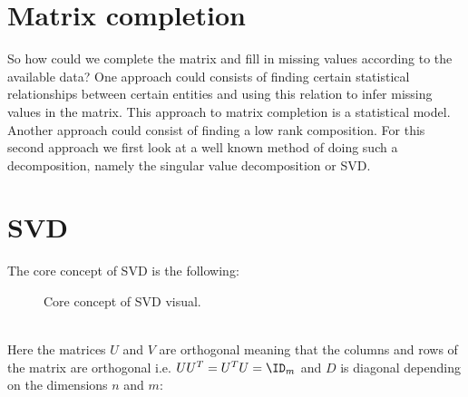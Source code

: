 \section{Matrix completion}
So how could we complete the matrix and fill in missing values according to the available data? One approach could consists of finding certain statistical relationships between certain entities and using this relation to infer missing values in the matrix. This approach to matrix completion is a statistical model.\\
Another approach could consist of finding a low rank composition. For this second approach we first look at a well known method of doing such a decomposition, namely the singular value decomposition or SVD.
\section{SVD}
The core concept of SVD is the following:
\begin{figure}[h!]
	\centering
	\label{fig:core}
	\caption{Core concept of SVD visual.}
\end{figure}\\
Here the matrices $U$ and $V$ are orthogonal meaning that the columns and rows of the matrix are orthogonal i.e. $UU^T = U^TU = \ID_m$ and $D$ is diagonal depending on the dimensions $n$ and $m$:
